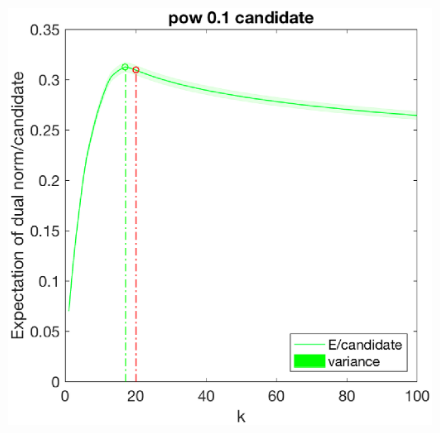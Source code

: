 \documentclass[12pt]{article}
\begin{document}
\begin{figure}[h]
\begin{minipage}[c]{.3\linewidth}
    \end{minipage}
    \hfill%
    \begin{minipage}[c]{.3\linewidth}
        \centering
        \includegraphics[width=\linewidth]{Fig/dualnorm-u0rand-k0-20-candidatepow.eps}
    \end{minipage}
\end{figure}
\end{document}
